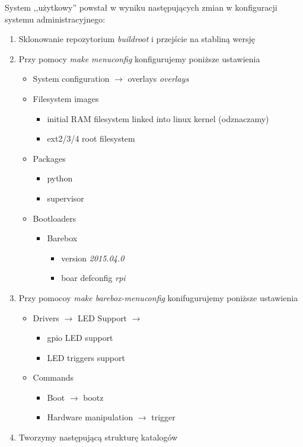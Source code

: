 System ,,użytkowy'' powstał w wyniku następujących zmian w konfiguracji systemu administracyjnego:
\begin{enumerate}
	\item Sklonowanie repozytorium \emph{buildroot} i przejście na stabliną wersję
	\item Przy pomocy \emph{make menuconfig}
	konfigurujemy poniższe ustawienia\\
	\begin{itemize}	
		\item System configuration $\rightarrow$ overlays \emph{overlays}
		\item Filesystem images
		\begin{itemize}
			\item initial RAM filesystem linked into linux kernel (odznaczamy)
			\item ext2/3/4 root filesystem
		\end{itemize}
		\item Packages 
		\begin{itemize}
			\item python
			\item supervisor
		\end{itemize}
		\item Bootloaders
		\begin{itemize}
			\item Barebox
			\begin{itemize}
				\item version \emph{2015.04.0}
				\item boar defconfig \emph{rpi}
			\end{itemize}
		\end{itemize}
	\end{itemize}
	\item Przy pomocoy \emph{make barebox-menuconfig}
	konifugurujemy poniższe ustawienia
	\begin{itemize}
		\item Drivers $\rightarrow$ LED Support $\rightarrow$ 
		\begin{itemize}
			\item gpio LED support
			\item LED triggers support
		\end{itemize}
		\item Commands
		\begin{itemize}
			\item Boot $\rightarrow$ bootz
			\item Hardware manipulation $\rightarrow$ trigger
		\end{itemize}
	\end{itemize}
	\item Tworzymy następującą strukturę katalogów


\end{enumerate}
